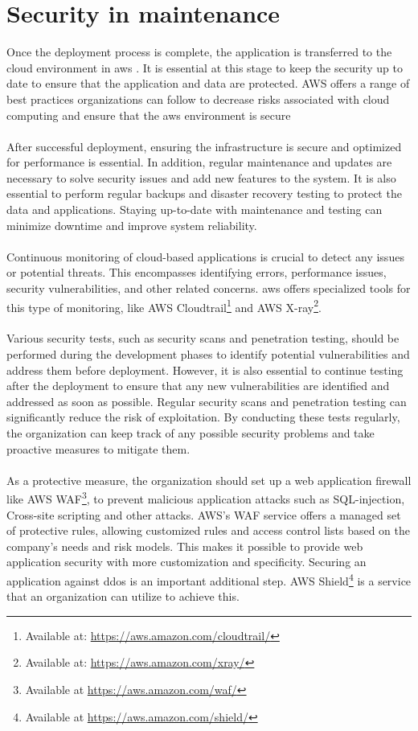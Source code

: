 \section{Security in maintenance}
Once the deployment process is complete, the application is transferred to the cloud environment in \acrlong{aws} \cite{awsafterdep}. It is essential at this stage to keep the security up to date to ensure that the application and data are protected. AWS offers a range of best practices organizations can follow to decrease risks associated with cloud computing and ensure that the  \acrshort{aws} environment is secure 
\\~\\
After successful deployment, ensuring the infrastructure is secure and optimized for performance is essential. In addition, regular maintenance and updates are necessary to solve security issues and add new features to the system. It is also essential to perform regular backups and disaster recovery testing to protect the data and applications. Staying up-to-date with maintenance and testing can minimize downtime and improve system reliability. 
\\~\\
Continuous monitoring of cloud-based applications is crucial to detect any issues or potential threats. This encompasses identifying errors, performance issues, security vulnerabilities, and other related concerns. \acrshort{aws} offers specialized tools for this type of monitoring, like AWS Cloudtrail\footnote{Available at: \url{https://aws.amazon.com/cloudtrail/}} and AWS X-ray\footnote{Available at: \url{https://aws.amazon.com/xray/}}. 
\\~\\
Various security tests, such as security scans and penetration testing, should be performed during the development phases to identify potential vulnerabilities and address them before deployment. However, it is also essential to continue testing after the deployment to ensure that any new vulnerabilities are identified and addressed as soon as possible. Regular security scans and penetration testing can significantly reduce the risk of exploitation. By conducting these tests regularly, the organization can keep track of any possible security problems and take proactive measures to mitigate them.
\\~\\
As a protective measure, the organization should set up a web application firewall like AWS WAF\footnote{Available at \url{https://aws.amazon.com/waf/}}, to prevent malicious application attacks such as \gls{SQL-injection}, \gls{Cross-site scripting} and other attacks. AWS's WAF service offers a managed set of protective rules, allowing customized rules and access control lists based on the company's needs and risk models. This makes it possible to provide web application security with more customization and specificity. Securing an application against \gls{ddos} is an important additional step. AWS Shield\footnote{Available at \url{https://aws.amazon.com/shield/}} is a service that an organization can utilize to achieve this. 
